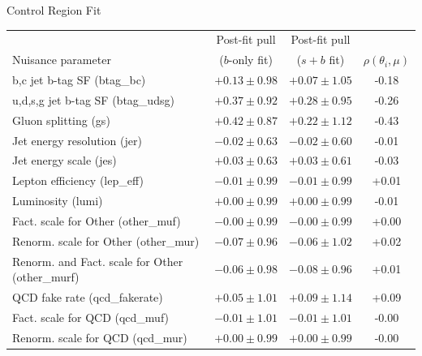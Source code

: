 \begin{subsection}{Control Region Fit}
\begin{table}[tbp!]
\begin{center}
\begin{tabular}{|l|c|c|c|} \hline
                                                  &  Post-fit pull     &  Post-fit pull     &                           \\
Nuisance parameter                                &  ($b$-only fit)    &  ($s+b$ fit)       &  $\rho(\theta_{i}, \mu)$  \\  
\hline
b,c jet b-tag SF (btag\_bc)                       &  $+0.13 \pm 0.98$  &  $+0.07 \pm 1.05$  &  -0.18                    \\
u,d,s,g jet b-tag SF (btag\_udsg)                 &  $+0.37 \pm 0.92$  &  $+0.28 \pm 0.95$  &  -0.26                    \\
Gluon splitting (gs)                              &  $+0.42 \pm 0.87$  &  $+0.22 \pm 1.12$  &  -0.43                    \\
Jet energy resolution (jer)                       &  $-0.02 \pm 0.63$  &  $-0.02 \pm 0.60$  &  -0.01                    \\
Jet energy scale (jes)                            &  $+0.03 \pm 0.63$  &  $+0.03 \pm 0.61$  &  -0.03                    \\
Lepton efficiency (lep\_eff)                      &  $-0.01 \pm 0.99$  &  $-0.01 \pm 0.99$  &  +0.01                    \\   
Luminosity (lumi)                                 &  $+0.00 \pm 0.99$  &  $+0.00 \pm 0.99$  &  -0.01                    \\   
Fact. scale for Other (other\_muf)                &  $-0.00 \pm 0.99$  &  $-0.00 \pm 0.99$  &  +0.00                    \\   
Renorm. scale for Other (other\_mur)              &  $-0.07 \pm 0.96$  &  $-0.06 \pm 1.02$  &  +0.02                    \\   
Renorm. and Fact. scale for Other (other\_murf)   &  $-0.06 \pm 0.98$  &  $-0.08 \pm 0.96$  &  +0.01                    \\   
QCD fake rate (qcd\_fakerate)                     &  $+0.05 \pm 1.01$  &  $+0.09 \pm 1.14$  &  +0.09                    \\   
Fact. scale for QCD (qcd\_muf)                    &  $-0.01 \pm 1.01$  &  $-0.01 \pm 1.01$  &  -0.00                    \\   
Renorm. scale for QCD (qcd\_mur)                  &  $+0.00 \pm 0.99$  &  $+0.00 \pm 0.99$  &  -0.00                    \\   

\end{tabular}
\end{center}
\end{table}
\end{subsection}
